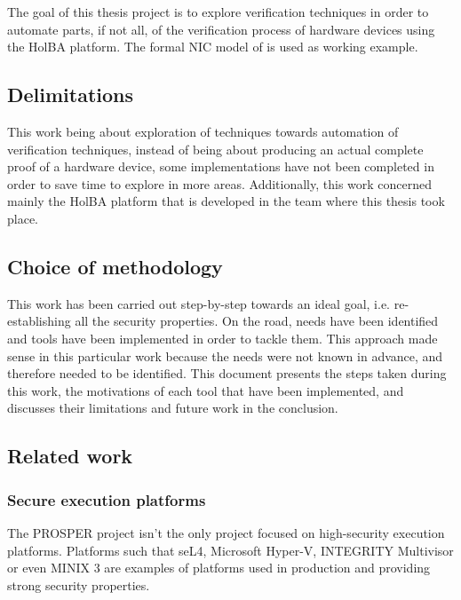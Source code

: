\documentclass[10pt,a4paper]{article}
\begin{document}
\begin{multicols}{2}
The goal of this thesis project is to explore verification techniques in order to automate parts, if not all, of the verification process of hardware devices using the HolBA platform. The formal {NIC} model of \cite{haglund_formal_2016} is used as working example.

\subsection{Delimitations}

This work being about exploration of techniques towards automation of verification techniques, instead of being about producing an actual complete proof of a hardware device, some implementations have not been completed in order to save time to explore in more areas. Additionally, this work concerned mainly the HolBA platform that is developed in the team where this thesis took place.

\subsection{Choice of methodology}

This work has been carried out step-by-step towards an ideal goal, i.e. re-establishing all the security properties. On the road, needs have been identified and tools have been implemented in order to tackle them. This approach made sense in this particular work because the needs were not known in advance, and therefore needed to be identified. This document presents the steps taken during this work, the motivations of each tool that have been implemented, and discusses their limitations and future work in the conclusion.

\subsection{Related work}

\subsubsection{Secure execution platforms}

The {PROSPER} project isn't the only project focused on high-security execution platforms. Platforms such that seL4, Microsoft Hyper-V, INTEGRITY Multivisor or even MINIX 3 are examples of platforms used in production and providing strong security properties.


\end{multicols}
\end{document}
